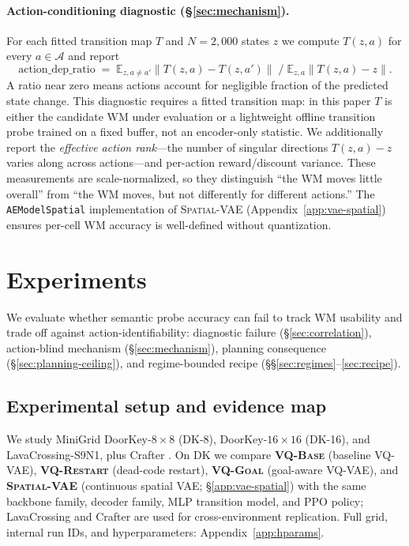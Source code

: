 \documentclass{article}
\newcommand{\encVQBase}{\textsc{VQ-Base}}
\newcommand{\encVQRestart}{\textsc{VQ-Restart}}
\newcommand{\encVQGoal}{\textsc{VQ-Goal}}
\newcommand{\encSpatialVAE}{\textsc{Spatial-VAE}}
\begin{document}
\paragraph{Action-conditioning diagnostic (\S\ref{sec:mechanism}).} For each fitted transition map $T$ and $N{=}2{,}000$ states $z$ we compute $T(z, a)$ for every $a \in \mathcal{A}$ and report
\begin{equation}
  \mathrm{action\_dep\_ratio} \;=\; \mathbb{E}_{z, a \neq a'} \|T(z, a) - T(z, a')\| \;\big/\; \mathbb{E}_{z, a} \|T(z, a) - z\|.
\end{equation}
A ratio near zero means actions account for negligible fraction of the predicted state change. This diagnostic requires a fitted transition map: in this paper $T$ is either the candidate WM under evaluation or a lightweight offline transition probe trained on a fixed buffer, not an encoder-only statistic. We additionally report the \emph{effective action rank}---the number of singular directions $T(z, a) - z$ varies along across actions---and per-action reward/discount variance. These measurements are scale-normalized, so they distinguish ``the WM moves little overall'' from ``the WM moves, but not differently for different actions.'' The \texttt{AEModelSpatial} implementation of \encSpatialVAE{} (Appendix~\ref{app:vae-spatial}) ensures per-cell WM accuracy is well-defined without quantization.

\section{Experiments}

We evaluate whether semantic probe accuracy can fail to track WM usability and trade off against action-identifiability: diagnostic failure (\S\ref{sec:correlation}), action-blind mechanism (\S\ref{sec:mechanism}), planning consequence (\S\ref{sec:planning-ceiling}), and regime-bounded recipe (\S\S\ref{sec:regimes}--\ref{sec:recipe}).

\subsection{Experimental setup and evidence map}

We study MiniGrid \citep{chevalier2023minigrid} DoorKey-$8\times8$ (DK-8), DoorKey-$16\times16$ (DK-16), and LavaCrossing-S9N1, plus Crafter \citep{hafner2022crafter}. On DK we compare \textbf{\encVQBase} (baseline VQ-VAE), \textbf{\encVQRestart} (dead-code restart), \textbf{\encVQGoal} (goal-aware VQ-VAE), and \textbf{\encSpatialVAE} (continuous spatial VAE; \S\ref{app:vae-spatial}) with the same backbone family, decoder family, MLP transition model, and PPO policy; LavaCrossing and Crafter are used for cross-environment replication. Full grid, internal run IDs, and hyperparameters: Appendix~\ref{app:hparams}.
\end{document}
